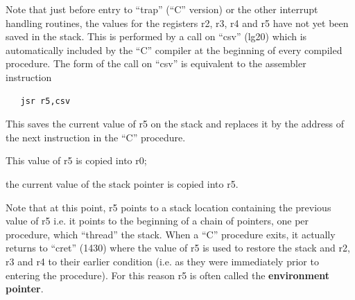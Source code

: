 Note that just before entry to ``trap''
(``C'' version) or the other interrupt
handling routines, the values for the
registers r2, r3, r4 and r5 have not
yet been saved in the stack. This is
performed by a call on ``csv'' (lg20)
which is automatically included by the
``C'' compiler at the beginning of every
compiled procedure. The form of the
call on ``csv'' is equivalent to the
assembler instruction

\begin{verbatim}
   jsr r5,csv
\end{verbatim}

This saves the current value of r5 on
the stack and replaces it by the
address of the next instruction in the
``C'' procedure.

\bd
\item[1421:] This value of r5 is copied into r0;

\item[1422:] the current value of the stack
 pointer is copied into r5.
\ed


Note that at this point, r5 points to a
stack location containing the previous
value of r5 i.e. it points to the
beginning of a chain of pointers, one
per procedure, which ``thread'' the
stack. When a ``C'' procedure exits, it
actually returns to ``cret'' (1430) where
the value of r5 is used to restore the
stack and r2, r3 and r4 to their earlier condition (i.e. as they were
immediately prior to entering the procedure). For this reason r5 is often
called the {\bf environment pointer}.
